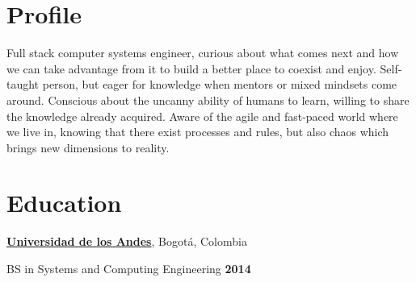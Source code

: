 \section{Profile\\}
%
Full stack computer systems engineer, curious about what comes next and how we
can take advantage from it to build a better place to coexist and enjoy. 
Self-taught person, but eager for knowledge when mentors or mixed mindsets come around. 
Conscious about the uncanny ability of humans to learn, willing to share
the knowledge already acquired.
Aware of the agile and fast-paced world where we live in, knowing that there exist processes and rules, 
but also chaos which brings new dimensions to reality.

%

%

\section{Education}
%
% 
% 
\href{http://www.uniandes.edu.co/}{\textbf{Universidad de los Andes}},
Bogot\'{a}, Colombia
\begin{outerlist}
\item[] BS in Systems and Computing Engineering \hfill \textbf{2014}
\end{outerlist}

